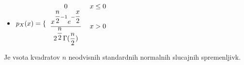 \documentclass{article}
\begin{document}
\begin{multicols}{3}
\begin{itemize}
    \item  \begin{math}
        p_{X}(x) =
        \{\begin{tabular}{ccc}
          $0$  & $x \leq 0$ & \\
          $\dfrac{x^{\dfrac{n}{2} - 1} e ^{- \dfrac{x}{2}}}{2^{\dfrac{n}{2}} \Gamma(\dfrac{n}{2})}$ & $x > 0$ & \\
        \end{tabular}
    \end{math} 
\end{itemize}

Je vsota kvadratov $n$ neodvisnih standardnih normalnih slucajnih spremenljivk.

\smallskip
\end{multicols}
\end{document}
